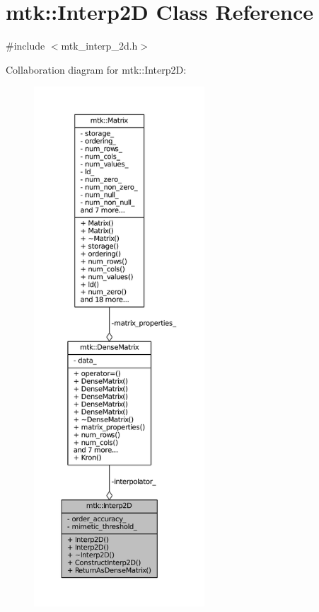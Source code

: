 \hypertarget{classmtk_1_1Interp2D}{\section{mtk\-:\-:Interp2\-D Class Reference}
\label{classmtk_1_1Interp2D}
}


{\ttfamily \#include $<$mtk\-\_\-interp\-\_\-2d.\-h$>$}



Collaboration diagram for mtk\-:\-:Interp2\-D\-:
\nopagebreak
\begin{figure}[H]
\begin{center}
\leavevmode
\includegraphics[height=550pt]{classmtk_1_1Interp2D__coll__graph}
\end{center}
\end{figure}
